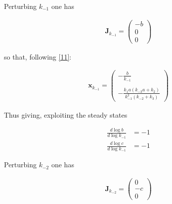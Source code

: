 \documentclass{article}
\begin{document}
	Perturbing $k_{-1}$ one has
	
	\begin{center}
		\begin{equation}
			\begin{aligned}
				\mathbf{J}_{k_{-1}}= \begin{pmatrix}
					-b\\
					0\\
					0
				\end{pmatrix}
				\label{102}
			\end{aligned}
		\end{equation}
	\end{center}
	
	so that, following \eqref{11}:
	
	\begin{center}
		\begin{equation}
			\begin{aligned}
				\mathbf{x}_{k_{-1}}= \begin{pmatrix}
					-\frac{b}{k_{-1}} \\ \\
					-\frac{k_{1}a (k_{-3}a +k_2)}{k_{-1}^2(k_{-2}+k_3)}
				\end{pmatrix}
				\label{103}
			\end{aligned}
		\end{equation}
	\end{center}
	
	
	Thus giving, exploiting the steady states
	
	\begin{center}
		\begin{equation}
			\begin{aligned}
				\frac{d \log b}{d \log k_{-1}} &= -1 \\
				\frac{d \log c}{d \log k_{-1}} &= -1
			\end{aligned}
		\end{equation}
	\end{center}
	
	Perturbing $k_{-2}$ one has
	
	\begin{center}
		\begin{equation}
			\begin{aligned}
				\mathbf{J}_{k_{-2}}= \begin{pmatrix}
					0\\
					-c\\
					0
				\end{pmatrix}
				\label{105}
			\end{aligned}
		\end{equation}
	\end{center}
	
\end{document}
